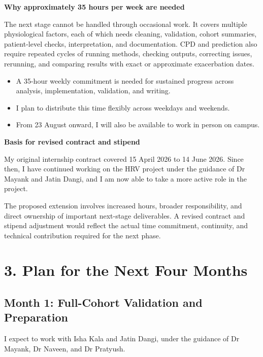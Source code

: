 \documentclass[10pt,a4paper]{article}
\begin{document}
\textbf{Why approximately 35 hours per week are needed}

The next stage cannot be handled through occasional work. It covers multiple physiological factors, each of which needs cleaning, validation, cohort summaries, patient-level checks, interpretation, and documentation. CPD and prediction also require repeated cycles of running methods, checking outputs, correcting issues, rerunning, and comparing results with exact or approximate exacerbation dates.

\begin{itemize}
    \item A 35-hour weekly commitment is needed for sustained progress across analysis, implementation, validation, and writing.
    \item I plan to distribute this time flexibly across weekdays and weekends.
    \item From 23 August onward, I will also be available to work in person on campus.
\end{itemize}

\textbf{Basis for revised contract and stipend}

My original internship contract covered 15 April 2026 to 14 June 2026. Since then, I have continued working on the HRV project under the guidance of Dr Mayank and Jatin Dangi, and I am now able to take a more active role in the project.

The proposed extension involves increased hours, broader responsibility, and direct ownership of important next-stage deliverables. A revised contract and stipend adjustment would reflect the actual time commitment, continuity, and technical contribution required for the next phase.

\newpage

\section{3. Plan for the Next Four Months}

\subsection{Month 1: Full-Cohort Validation and Preparation}

I expect to work with Isha Kala and Jatin Dangi, under the guidance of Dr Mayank, Dr Naveen, and Dr Pratyush.
\end{document}
